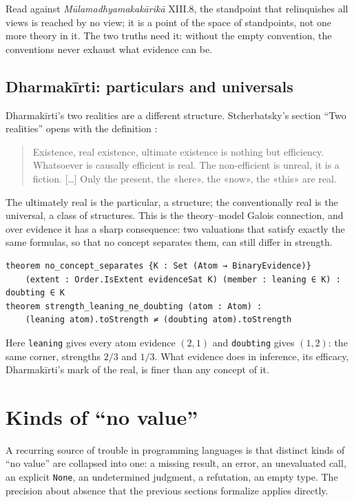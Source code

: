 \documentclass[11pt]{article}
\newcommand{\code}[1]{\texttt{#1}}
\theoremstyle{plain}
\theoremstyle{definition}
\begin{document}
\noindent Read against \emph{Mūlamadhyamakakārikā} XIII.8, the standpoint that relinquishes
all views is reached by no view; it is a point of the space of standpoints, not one more
theory in it. The two truths need it: without the empty convention, the conventions never
exhaust what evidence can be.

\subsection{Dharmakīrti: particulars and universals}

Dharmakīrti's two realities are a different structure. Stcherbatsky's section ``Two
realities'' opens with the definition \cite[p.~69]{Stcherbatsky1932}:

\begin{quote}
Existence, real existence, ultimate existence is nothing but efficiency. Whatsoever is
causally efficient is real. The non-efficient is unreal, it is a fiction. [\ldots] Only the
present, the «here», the «now», the «this» are real.
\end{quote}

\noindent The ultimately real is the particular, a structure; the conventionally real is the
universal, a class of structures. This is the
theory--model Galois connection, and over evidence it has a sharp consequence: two valuations
that satisfy exactly the same formulas, so that no concept separates them, can still differ
in strength.

\begin{lstlisting}
theorem no_concept_separates {K : Set (Atom → BinaryEvidence)}
    (extent : Order.IsExtent evidenceSat K) (member : leaning ∈ K) : doubting ∈ K
theorem strength_leaning_ne_doubting (atom : Atom) :
    (leaning atom).toStrength ≠ (doubting atom).toStrength
\end{lstlisting}

\noindent Here \code{leaning} gives every atom evidence $(2,1)$ and \code{doubting} gives
$(1,2)$: the same corner, strengths $2/3$ and $1/3$. What evidence does in inference, its
efficacy, Dharmakīrti's mark of the real, is finer than any concept of it.

\section{Kinds of ``no value''}
\label{sec:novalue}

A recurring source of trouble in programming languages is that distinct kinds of ``no value''
are collapsed into one: a missing result, an error, an unevaluated call, an explicit
\code{None}, an undetermined judgment, a refutation, an empty type. The precision about
absence that the previous sections formalize applies directly.
\end{document}
